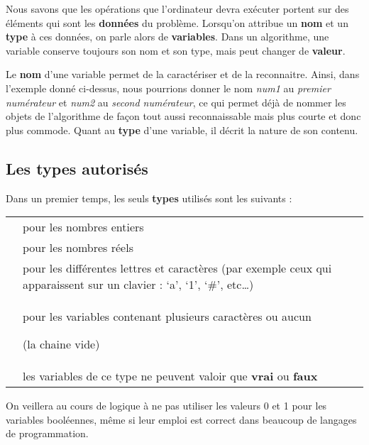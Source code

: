 		Nous savons que les opérations que l’ordinateur devra exécuter portent
		sur des éléments qui sont les \textbf{données} du problème. Lorsqu’on
		attribue un \textbf{nom} et un \textbf{type} à ces données, on parle
		alors de \textbf{variables}. Dans un algorithme, une variable conserve
		toujours son nom et son type, mais peut changer de \textbf{valeur}.
		
		Le \textbf{nom }d’une variable permet de la caractériser et de la
		reconnaitre. Ainsi, dans l’exemple donné ci-dessus, nous pourrions
		donner le nom \textit{num1} au \textit{premier numérateur} et
		\textit{num2} au \textit{second numérateur}, ce qui permet déjà de
		nommer les objets de l’algorithme de façon tout aussi reconnaissable
		mais plus courte et donc plus commode. Quant au \textbf{type} d’une
		variable, il décrit la nature de son contenu.

		\subsection{Les types autorisés}

			Dans un premier temps, les seuls \textbf{types} utilisés sont les
			suivants :
			
			\begin{center}
			\tablehead{}
			\begin{supertabular}{m{1.8109999cm}|m{11.918cm}}
			\raggedleft  {} &
			 pour les nombres entiers\\
			\raggedleft  {} &
			 pour les nombres réels\\
			\raggedleft  {} &
			 pour les différentes lettres et caractères (par
			exemple ceux qui apparaissent sur un clavier : ‘a’, ‘1’, ‘\#’, etc…)\\
			\raggedleft  {} &
			{ pour les variables contenant plusieurs
			caractères ou aucun}
			
			 (la chaine vide)\\
			\raggedleft  {} &
			 les variables de ce type ne peuvent valoir que
			\textbf{vrai} ou \textbf{faux}\\
			\end{supertabular}
			\end{center}
			
			On veillera au cours de logique à ne pas utiliser les valeurs 0 et 1
			pour les variables booléennes, même si leur emploi est correct dans
			beaucoup de langages de programmation.

